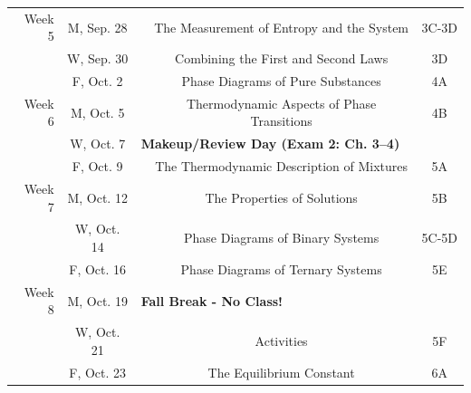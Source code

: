 \begin{tabular}{rcccc}
	\midrule
	Week 5      & M, Sep. 28 &                                                                                             & The Measurement of Entropy and the System    & 3C-3D   \\
	            & W, Sep. 30 &                                                                                             & Combining the First and Second Laws          & 3D      \\
	            & F, Oct. 2  &                                                                                             & Phase Diagrams of Pure Substances            & 4A      \\
	\midrule
	Week 6      & M, Oct. 5  &                                                                                             & Thermodynamic Aspects of Phase Transitions   & 4B      \\
	            & W, Oct. 7  & \multicolumn{3}{l}{\textbf{Makeup/Review Day (Exam 2: Ch. 3--4)}}                                                                                    \\
	            & F, Oct. 9  &                                                                                             & The Thermodynamic Description of Mixtures    & 5A      \\
	\midrule
	Week 7      & M, Oct. 12 &                                                                                             & The Properties of Solutions                  & 5B      \\
	            & W, Oct. 14 &                                                                                             & Phase Diagrams of Binary Systems             & 5C-5D   \\
	            & F, Oct. 16 &                                                                                             & Phase Diagrams of Ternary Systems            & 5E      \\
	\midrule
	Week 8      & M, Oct. 19 & \multicolumn{3}{l}{\textbf{Fall Break - No Class!}}                                                                                                  \\
	            & W, Oct. 21 &                                                                                             & Activities                                   & 5F      \\
	            & F, Oct. 23 &                                                                                             & The Equilibrium Constant                     & 6A      \\

\end{tabular}
